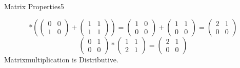 \begin{questions}
\begin{question}{Matrix Properties}{5}
\begin{answer}
\begin{enumerate}
\begin{equation*}
		*(
		\begin{pmatrix} %
			0 & 0 \\	%
			1 & 0
		\end{pmatrix}
		+ 
		\begin{pmatrix} %
			1 & 1 \\	%
			1 & 1
		\end{pmatrix}
		) =
		\begin{pmatrix} %
			1 & 0 \\	%
			0 & 0
		\end{pmatrix}
		+
		\begin{pmatrix} %
			1 & 1 \\	%
			0 & 0
		\end{pmatrix}
		=
		\begin{pmatrix} %
			2 & 1 \\	%
			0 & 0
		\end{pmatrix} 
		\end{equation*}
		\begin{equation*}
	  	\begin{pmatrix} %
	  		0 & 1 \\	%
	  		0 & 0
	  	\end{pmatrix} 
  		*
  		\begin{pmatrix} %
  			1 & 1 \\	%
  			2 & 1
  		\end{pmatrix} 
  		=
  		\begin{pmatrix} %
  			2 & 1 \\	%
  			0 & 0
  		\end{pmatrix} 
	\end{equation*}
	Matrixmultiplication is Distributive.\\
		

\end{enumerate}
\end{answer}
\end{question}
\end{questions}
